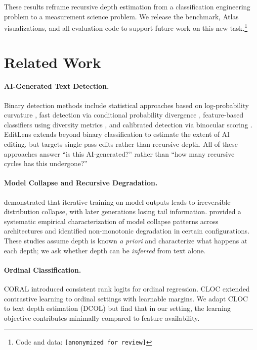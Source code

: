 \documentclass[11pt,a4paper]{article}
\begin{document}
These results reframe recursive depth estimation from a classification engineering problem to a measurement science problem.
We release the benchmark, Atlas visualizations, and all evaluation code to support future work on this new task.\footnote{Code and data: \texttt{[anonymized for review]}}

\section{Related Work}

\paragraph{AI-Generated Text Detection.}
Binary detection methods include statistical approaches based on log-probability curvature \citep{mitchell2023detectgpt}, fast detection via conditional probability divergence \citep{bao2024fastdetectgpt}, feature-based classifiers using diversity metrics \citep{tulchinskii2024diveye}, and calibrated detection via binocular scoring \citep{hans2024binoculars}.
EditLens \citep{deng2024editlens} extends beyond binary classification to estimate the extent of AI editing, but targets single-pass edits rather than recursive depth.
All of these approaches answer ``is this AI-generated?'' rather than ``how many recursive cycles has this undergone?''

\paragraph{Model Collapse and Recursive Degradation.}
\citet{shumailov2024ai} demonstrated that iterative training on model outputs leads to irreversible distribution collapse, with later generations losing tail information.
\citet{drayson2025model} provided a systematic empirical characterization of model collapse patterns across architectures and identified non-monotonic degradation in certain configurations.
These studies assume depth is known \emph{a priori} and characterize what happens at each depth; we ask whether depth can be \emph{inferred} from text alone.

\paragraph{Ordinal Classification.}
CORAL \citep{cao2020rank} introduced consistent rank logits for ordinal regression.
CLOC \citep{dai2025cloc} extended contrastive learning to ordinal settings with learnable margins.
We adapt CLOC to text depth estimation (DCOL) but find that in our setting, the learning objective contributes minimally compared to feature availability.
\end{document}
